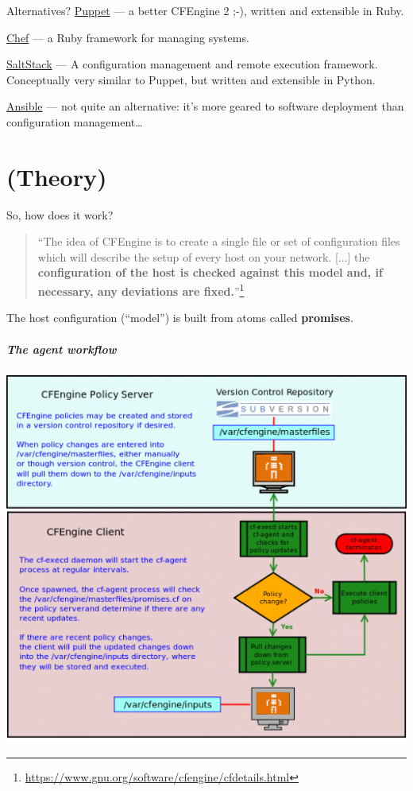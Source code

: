\documentclass[english,serif,mathserif,usenames,dvipsnames]{beamer}
\begin{document}
\begin{frame}{Alternatives?}
  \href{http://puppetlabs.com/}{Puppet} --- a better CFEngine 2 ;-),
  written and extensible in Ruby.

  \+ \href{https://www.chef.io/chef/}{Chef} --- a Ruby framework for
  managing systems.

  \+ \href{http://saltstack.com/}{SaltStack} --- A configuration
  management and remote execution framework. Conceptually very similar
  to Puppet, but written and extensible in Python.

  \+ \href{http://ansible.cc}{Ansible} --- not quite an alternative:
  it's more geared to software deployment than configuration
  management\ldots
\end{frame}


\part{(Theory)}
\begin{frame}{So, how does it work?}
  \begin{quote}
    ``The idea of CFEngine is to create a single file or set of
    configuration files which will describe the setup of every host on
    your network. [...] the \textbf{configuration of the host is
      checked against this model and, if necessary, any deviations are
      fixed.}''\footnote{%
      \url{https://www.gnu.org/software/cfengine/cfdetails.html}
    }%
  \end{quote}

  \+ The host configuration (``model'') is built from atoms called
  \textbf{promises}.
\end{frame}


\begin{frame}
  \frametitle{The agent workflow}
  \begin{center}
    \includegraphics[height=0.8\textheight]{agent-workflow.png}
  \end{center}
\end{frame}
\end{document}
